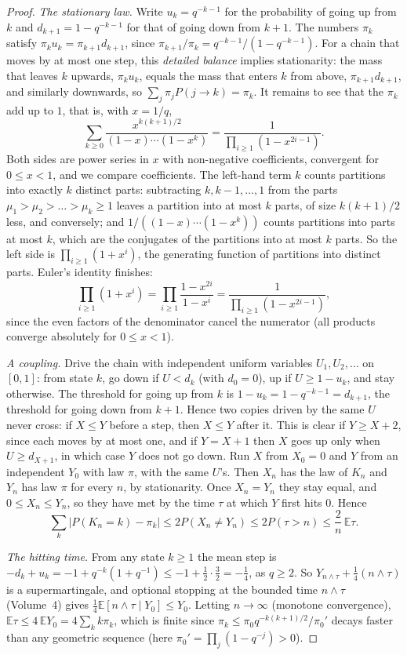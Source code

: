 \begin{proof}
\emph{The stationary law.} Write $u_k=q^{-k-1}$ for the probability of going up from $k$ and $d_{k+1}=1-q^{-k-1}$ for that of going down from $k+1$. The numbers $\pi_k$ satisfy $\pi_ku_k=\pi_{k+1}d_{k+1}$, since $\pi_{k+1}/\pi_k=q^{-k-1}/(1-q^{-k-1})$. For a chain that moves by at most one step, this \emph{detailed balance} implies stationarity: the mass that leaves $k$ upwards, $\pi_ku_k$, equals the mass that enters $k$ from above, $\pi_{k+1}d_{k+1}$, and similarly downwards, so $\sum_j\pi_jP(j\to k)=\pi_k$. It remains to see that the $\pi_k$ add up to $1$, that is, with $x=1/q$,
\[
\sum_{k\ge0}\frac{x^{k(k+1)/2}}{(1-x)\cdots(1-x^k)}=\frac1{\prod_{i\ge1}(1-x^{2i-1})}.
\]
Both sides are power series in $x$ with non-negative coefficients, convergent for $0\le x<1$, and we compare coefficients. The left-hand term $k$ counts partitions into exactly $k$ distinct parts: subtracting $k,k-1,\dots,1$ from the parts $\mu_1>\mu_2>\dots>\mu_k\ge1$ leaves a partition into at most $k$ parts, of size $k(k+1)/2$ less, and conversely; and $1/((1-x)\cdots(1-x^k))$ counts partitions into parts at most $k$, which are the conjugates of the partitions into at most $k$ parts. So the left side is $\prod_{i\ge1}(1+x^i)$, the generating function of partitions into distinct parts. Euler's identity finishes:
\[
\prod_{i\ge1}(1+x^i)=\prod_{i\ge1}\frac{1-x^{2i}}{1-x^i}=\frac1{\prod_{i\ge1}(1-x^{2i-1})},
\]
since the even factors of the denominator cancel the numerator (all products converge absolutely for $0\le x<1$).

\emph{A coupling.} Drive the chain with independent uniform variables $U_1,U_2,\dots$ on $[0,1]$: from state $k$, go down if $U<d_k$ (with $d_0=0$), up if $U\ge1-u_k$, and stay otherwise. The threshold for going up from $k$ is $1-u_k=1-q^{-k-1}=d_{k+1}$, the threshold for going down from $k+1$. Hence two copies driven by the same $U$ never cross: if $X\le Y$ before a step, then $X\le Y$ after it. This is clear if $Y\ge X+2$, since each moves by at most one, and if $Y=X+1$ then $X$ goes up only when $U\ge d_{X+1}$, in which case $Y$ does not go down. Run $X$ from $X_0=0$ and $Y$ from an independent $Y_0$ with law $\pi$, with the same $U$'s. Then $X_n$ has the law of $K_n$ and $Y_n$ has law $\pi$ for every $n$, by stationarity. Once $X_n=Y_n$ they stay equal, and $0\le X_n\le Y_n$, so they have met by the time $\tau$ at which $Y$ first hits $0$. Hence
\[
\sum_k|P(K_n=k)-\pi_k|\le2P(X_n\ne Y_n)\le2P(\tau>n)\le\frac2n\,\mathbb E\tau.
\]

\emph{The hitting time.} From any state $k\ge1$ the mean step is $-d_k+u_k=-1+q^{-k}(1+q^{-1})\le-1+\frac12\cdot\frac32=-\frac14$, as $q\ge2$. So $Y_{n\wedge\tau}+\frac14(n\wedge\tau)$ is a supermartingale, and optional stopping at the bounded time $n\wedge\tau$ (Volume~4) gives $\frac14\mathbb E[n\wedge\tau\mid Y_0]\le Y_0$. Letting $n\to\infty$ (monotone convergence), $\mathbb E\tau\le4\,\mathbb EY_0=4\sum_kk\pi_k$, which is finite since $\pi_k\le\pi_0q^{-k(k+1)/2}/\pi_0'$ decays faster than any geometric sequence (here $\pi_0'=\prod_j(1-q^{-j})>0$).
\end{proof}

